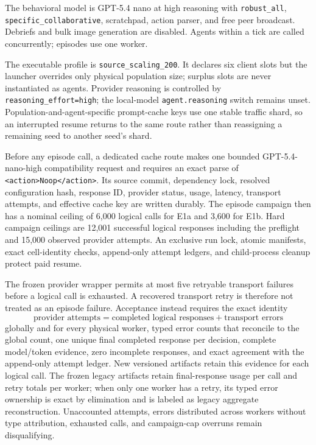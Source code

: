 \documentclass[11pt]{article}
\newcommand{\code}[1]{\texttt{#1}}
\begin{document}
The behavioral model is GPT-5.4 nano at high reasoning with
\code{robust\_all}, \code{specific\_collaborative}, scratchpad, action parser,
and free peer broadcast.  Debriefs and bulk image generation are disabled.
Agents within a tick are called concurrently; episodes use one worker.

The executable profile is \code{source\_scaling\_200}.  It declares six client
slots but the launcher overrides only physical population size; surplus slots
are never instantiated as agents.  Provider reasoning is controlled by
\code{reasoning\_effort=high}; the local-model \code{agent.reasoning} switch
remains unset.  Population-and-agent-specific prompt-cache keys use one stable
traffic shard, so an interrupted resume returns to the same route rather than
reassigning a remaining seed to another seed's shard.

Before any episode call, a dedicated cache route makes one bounded
GPT-5.4-nano-high compatibility request and requires an exact parse of
\code{<action>Noop</action>}.  Its source commit, dependency lock, resolved
configuration hash, response ID, provider status, usage, latency, transport
attempts, and effective cache key are written durably.  The episode campaign
then has a nominal ceiling of 6,000 logical calls for E1a and 3,600 for E1b.
Hard campaign ceilings are 12,001 successful logical responses including the
preflight and 15,000 observed provider attempts.  An exclusive run lock,
atomic manifests, exact cell-identity checks, append-only attempt ledgers, and
child-process cleanup protect paid resume.

The frozen provider wrapper permits at most five retryable transport failures
before a logical call is exhausted.  A recovered transport retry is therefore
not treated as an episode failure.  Acceptance instead requires the exact
identity
\[
  \text{provider attempts}
  =
  \text{completed logical responses}
  +
  \text{transport errors}
\]
globally and for every physical worker, typed error counts that reconcile to
the global count, one unique final completed response per decision, complete
model/token evidence, zero incomplete responses, and exact agreement with the
append-only attempt ledger.  New versioned artifacts retain this evidence for
each logical call.  The frozen legacy artifacts retain final-response usage
per call and retry totals per worker; when only one worker has a retry, its
typed error ownership is exact by elimination and is labeled as legacy
aggregate reconstruction.  Unaccounted attempts, errors distributed across
workers without type attribution, exhausted calls, and campaign-cap overruns
remain disqualifying.
\end{document}
